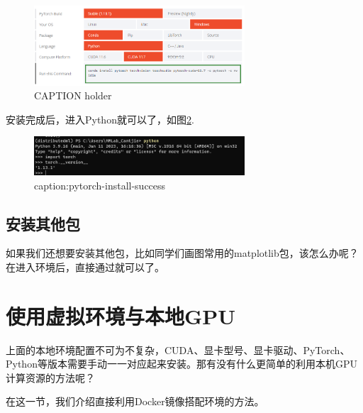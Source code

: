 \begin{figure}[htbp]
	\centering
	\includegraphics[width=0.7\textwidth]{figures/pytorch-install-command.png}
	\caption{CAPTION holder}
	\label{fig:pytorch-install-command}
\end{figure}

安装完成后，进入Python就可以了，如图\ref{fig:pytorch-install-success}.

\begin{figure}[htbp]
	\centering
	\includegraphics[width=0.7\textwidth]{figures/pytorch-install-success.png}
	\caption{caption:pytorch-install-success}
	\label{fig:pytorch-install-success}
\end{figure}

\subsection{安装其他包}

如果我们还想要安装其他包，比如同学们画图常用的matplotlib包，该怎么办呢？在进入环境后，直接通过就可以了。




\section{使用虚拟环境与本地GPU}

上面的本地环境配置不可为不复杂，CUDA、显卡型号、显卡驱动、PyTorch、Python等版本需要手动一一对应起来安装。那有没有什么更简单的利用本机GPU计算资源的方法呢？

在这一节，我们介绍直接利用Docker镜像搭配环境的方法。

